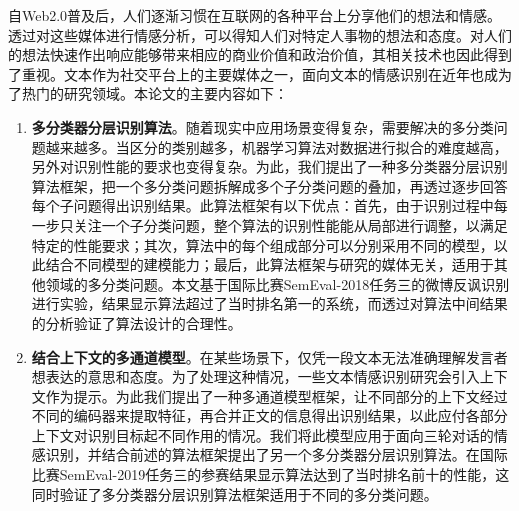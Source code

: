 \begin{cabstract}

自Web2.0普及后，人们逐渐习惯在互联网的各种平台上分享他们的想法和情感。透过对这些媒体进行情感分析，可以得知人们对特定人事物的想法和态度。对人们的想法快速作出响应能够带来相应的商业价值和政治价值，其相关技术也因此得到了重视。文本作为社交平台上的主要媒体之一，面向文本的情感识别在近年也成为了热门的研究领域。本论文的主要内容如下：

\begin{enumerate}

\item {\bf 多分类器分层识别算法}。随着现实中应用场景变得复杂，需要解决的多分类问题越来越多。当区分的类别越多，机器学习算法对数据进行拟合的难度越高，另外对识别性能的要求也变得复杂。为此，我们提出了一种多分类器分层识别算法框架，把一个多分类问题拆解成多个子分类问题的叠加，再透过逐步回答每个子问题得出识别结果。此算法框架有以下优点：首先，由于识别过程中每一步只关注一个子分类问题，整个算法的识别性能能从局部进行调整，以满足特定的性能要求；其次，算法中的每个组成部分可以分别采用不同的模型，以此结合不同模型的建模能力；最后，此算法框架与研究的媒体无关，适用于其他领域的多分类问题。本文基于国际比赛SemEval-2018任务三的微博反讽识别进行实验，结果显示算法超过了当时排名第一的系统，而透过对算法中间结果的分析验证了算法设计的合理性。

\item {\bf 结合上下文的多通道模型}。在某些场景下，仅凭一段文本无法准确理解发言者想表达的意思和态度。为了处理这种情况，一些文本情感识别研究会引入上下文作为提示。为此我们提出了一种多通道模型框架，让不同部分的上下文经过不同的编码器来提取特征，再合并正文的信息得出识别结果，以此应付各部分上下文对识别目标起不同作用的情况。我们将此模型应用于面向三轮对话的情感识别，并结合前述的算法框架提出了另一个多分类器分层识别算法。在国际比赛SemEval-2019任务三的参赛结果显示算法达到了当时排名前十的性能，这同时验证了多分类器分层识别算法框架适用于不同的多分类问题。

\end{enumerate}


\end{cabstract}


